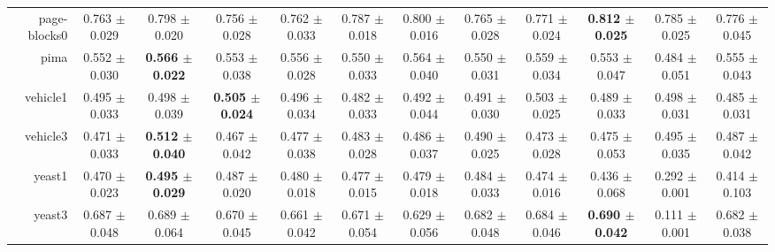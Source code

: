 \begin{table}[!ht]
{\begin{tabular}{r c c c c c c c c c c c}
page-blocks0 & 0.763 $\pm$ 0.029 & 0.798 $\pm$ 0.020 & 0.756 $\pm$ 0.028 & 0.762 $\pm$ 0.033 & 0.787 $\pm$ 0.018 & 0.800 $\pm$ 0.016 & 0.765 $\pm$ 0.028 & 0.771 $\pm$ 0.024 & \textbf{0.812 $\pm$ 0.025} & 0.785 $\pm$ 0.025 & 0.776 $\pm$ 0.045 \\
pima & 0.552 $\pm$ 0.030 & \textbf{0.566 $\pm$ 0.022} & 0.553 $\pm$ 0.038 & 0.556 $\pm$ 0.028 & 0.550 $\pm$ 0.033 & 0.564 $\pm$ 0.040 & 0.550 $\pm$ 0.031 & 0.559 $\pm$ 0.034 & 0.553 $\pm$ 0.047 & 0.484 $\pm$ 0.051 & 0.555 $\pm$ 0.043 \\
vehicle1 & 0.495 $\pm$ 0.033 & 0.498 $\pm$ 0.039 & \textbf{0.505 $\pm$ 0.024} & 0.496 $\pm$ 0.034 & 0.482 $\pm$ 0.033 & 0.492 $\pm$ 0.044 & 0.491 $\pm$ 0.030 & 0.503 $\pm$ 0.025 & 0.489 $\pm$ 0.033 & 0.498 $\pm$ 0.031 & 0.485 $\pm$ 0.031 \\
vehicle3 & 0.471 $\pm$ 0.033 & \textbf{0.512 $\pm$ 0.040} & 0.467 $\pm$ 0.042 & 0.477 $\pm$ 0.038 & 0.483 $\pm$ 0.028 & 0.486 $\pm$ 0.037 & 0.490 $\pm$ 0.025 & 0.473 $\pm$ 0.028 & 0.475 $\pm$ 0.053 & 0.495 $\pm$ 0.035 & 0.487 $\pm$ 0.042 \\
yeast1 & 0.470 $\pm$ 0.023 & \textbf{0.495 $\pm$ 0.029} & 0.487 $\pm$ 0.020 & 0.480 $\pm$ 0.018 & 0.477 $\pm$ 0.015 & 0.479 $\pm$ 0.018 & 0.484 $\pm$ 0.033 & 0.474 $\pm$ 0.016 & 0.436 $\pm$ 0.068 & 0.292 $\pm$ 0.001 & 0.414 $\pm$ 0.103 \\
yeast3 & 0.687 $\pm$ 0.048 & 0.689 $\pm$ 0.064 & 0.670 $\pm$ 0.045 & 0.661 $\pm$ 0.042 & 0.671 $\pm$ 0.054 & 0.629 $\pm$ 0.056 & 0.682 $\pm$ 0.048 & 0.684 $\pm$ 0.046 & \textbf{0.690 $\pm$ 0.042} & 0.111 $\pm$ 0.001 & 0.682 $\pm$ 0.038 \\
\end{tabular}}
\end{table}
